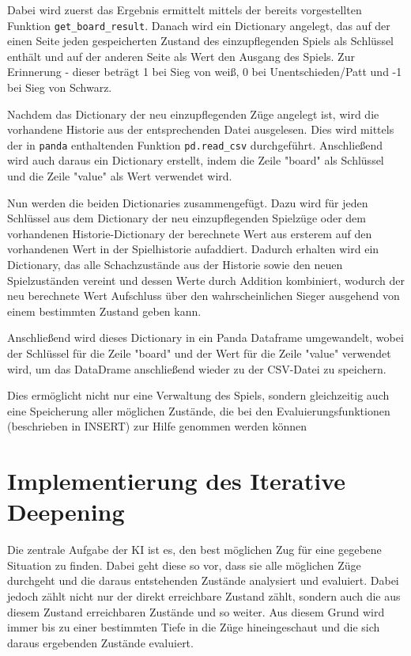     Dabei wird zuerst das Ergebnis ermittelt mittels der bereits
vorgestellten Funktion \texttt{get\_board\_result}. Danach wird ein
Dictionary angelegt, das auf der einen Seite jeden gespeicherten Zustand
des einzupflegenden Spiels als Schlüssel enthält und auf der anderen
Seite als Wert den Ausgang des Spiels. Zur Erinnerung - dieser beträgt 1
bei Sieg von weiß, 0 bei Unentschieden/Patt und -1 bei Sieg von Schwarz.

Nachdem das Dictionary der neu einzupflegenden Züge angelegt ist, wird
die vorhandene Historie aus der entsprechenden Datei ausgelesen. Dies
wird mittels der in \texttt{panda} enthaltenden Funktion
\texttt{pd.read\_csv} durchgeführt. Anschließend wird auch daraus ein
Dictionary erstellt, indem die Zeile "board" als Schlüssel und die Zeile
"value" als Wert verwendet wird.

Nun werden die beiden Dictionaries zusammengefügt. Dazu wird für jeden
Schlüssel aus dem Dictionary der neu einzupflegenden Spielzüge oder dem
vorhandenen Historie-Dictionary der berechnete Wert aus ersterem auf den
vorhandenen Wert in der Spielhistorie aufaddiert. Dadurch erhalten wird
ein Dictionary, das alle Schachzustände aus der Historie sowie den neuen
Spielzuständen vereint und dessen Werte durch Addition kombiniert,
wodurch der neu berechnete Wert Aufschluss über den wahrscheinlichen
Sieger ausgehend von einem bestimmten Zustand geben kann.

Anschließend wird dieses Dictionary in ein Panda Dataframe umgewandelt,
wobei der Schlüssel für die Zeile "board" und der Wert für die Zeile
"value" verwendet wird, um das DataDrame anschließend wieder zu der
CSV-Datei zu speichern.

Dies ermöglicht nicht nur eine Verwaltung des Spiels, sondern
gleichzeitig auch eine Speicherung aller möglichen Zustände, die bei den
Evaluierungsfunktionen (beschrieben in INSERT) zur Hilfe genommen werden
können

    \section{Implementierung des Iterative Deepening}\label{implementierung-des-iterative-deepening}

Die zentrale Aufgabe der KI ist es, den best möglichen Zug für eine
gegebene Situation zu finden. Dabei geht diese so vor, dass sie alle
möglichen Züge durchgeht und die daraus entstehenden Zustände analysiert
und evaluiert. Dabei jedoch zählt nicht nur der direkt erreichbare
Zustand zählt, sondern auch die aus diesem Zustand erreichbaren Zustände
und so weiter. Aus diesem Grund wird immer bis zu einer bestimmten Tiefe
in die Züge hineingeschaut und die sich daraus ergebenden Zustände
evaluiert.

